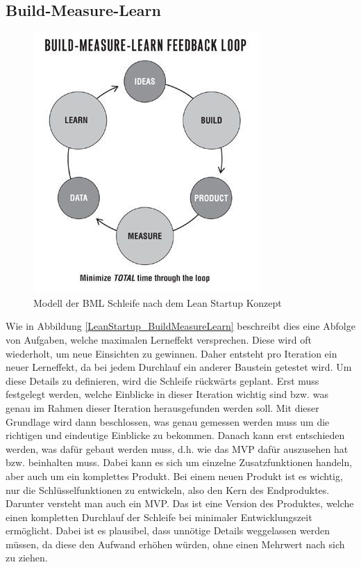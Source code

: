 \subsection*{\label{sec:LeanStartup-BML}\thesubsection\quad Build-Measure-Learn}
\begin{figure}
	\begin{center}
		\includegraphics[scale=1]{99_IMG/02_Grundlagen/buildmeasurelearn.jpg}
		\caption{Modell der \ac{BML} Schleife nach dem Lean Startup Konzept}
		\label{fig:LeanStartup_BuildMeasureLearn}
	\end{center}
\end{figure}
Wie in Abbildung \ref{LeanStartup_BuildMeasureLearn} beschreibt dies eine Abfolge von Aufgaben, welche maximalen Lerneffekt versprechen. Diese wird oft wiederholt, um neue Einsichten zu gewinnen. Daher entsteht pro Iteration ein neuer Lerneffekt, da bei jedem Durchlauf ein anderer Baustein getestet wird. Um diese Details zu definieren, wird die Schleife rückwärts geplant. Erst muss festgelegt werden, welche Einblicke in dieser Iteration wichtig sind bzw. was genau im Rahmen dieser Iteration herausgefunden werden soll. Mit dieser Grundlage wird dann beschlossen, was genau gemessen werden muss um die richtigen und eindeutige Einblicke zu bekommen. Danach kann erst entschieden werden, was dafür gebaut werden muss, d.h. wie das \ac{MVP} dafür auszusehen hat bzw. beinhalten muss. Dabei kann es sich um einzelne Zusatzfunktionen handeln, aber auch um ein komplettes Produkt. Bei einem neuen Produkt ist es wichtig, nur die Schlüsselfunktionen zu entwickeln, also den Kern des Endproduktes. Darunter versteht man auch ein \ac{MVP}. Das ist eine Version des Produktes, welche einen kompletten Durchlauf der Schleife bei minimaler Entwicklungszeit ermöglicht. Dabei ist es plausibel, dass unnötige Details weggelassen werden müssen, da diese den Aufwand erhöhen würden, ohne einen Mehrwert nach sich zu ziehen.

